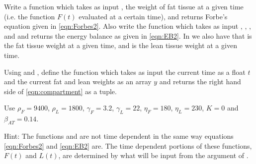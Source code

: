 \begin{problem}
Write a function  which takes as input , the weight of fat tissue at a given time (i.e. the function $F(t)$ evaluated at a certain time), and returns Forbe's equation given in \eqref{eqn:Forbes2}.
Also write the function  which takes as input , , , and  and returns the energy balance as given in \eqref{eqn:EB2}.
In  we also have that  is the fat tissue weight at a given time, and  is the lean tissue weight at a given time.

Using  and , define the function  which takes as input the current time as a float $t$ and the current fat and lean weights as an array $y$ and returns the right hand side of \eqref{eqn:compartment} as a tuple.

Use $\rho_F = 9400$, $\rho_L = 1800$, $\gamma_F = 3.2$, $\gamma_L = 22$, $\eta_F = 180$, $\eta_L = 230$, $K=0$ and $\beta_{AT} = 0.14$.

Hint: The functions  and  are not time dependent in the same way equations \eqref{eqn:Forbes2} and \eqref{eqn:EB2} are.
The time dependent portions of these functions, $F(t)$ and $L(t)$, are determined by what will be input from the  argument of .
\end{problem}

